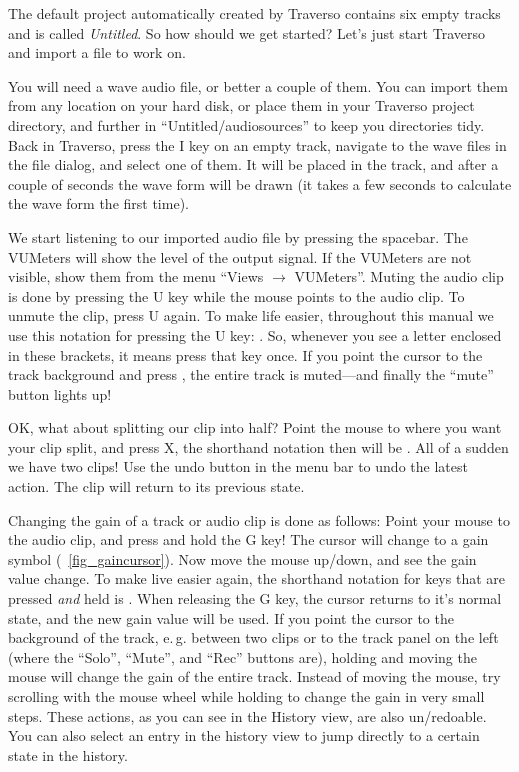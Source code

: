 The default project automatically created by Traverso contains six empty tracks and is called \emph{Untitled}. So how should we get started?
Let's just start Traverso and import a file to work on.

You will need a wave audio file, or better a couple of them. You can import them from any location on your hard disk, or place them in your Traverso project directory, and further in ``Untitled/audiosources'' to keep you directories tidy. Back in Traverso, press the I key on an empty track, navigate to the wave files in the file dialog, and select one of them. It will be placed in the track, and after a couple of seconds the wave form will be drawn (it takes a few seconds to calculate the wave form the first time).

We start listening to our imported audio file by pressing the spacebar. The VUMeters will show the level of the output signal. If the VUMeters are not visible, show them from the menu ``Views $\rightarrow$ VUMeters''. Muting the audio clip is done by pressing the U key while the mouse points to the audio clip. To unmute the clip, press U again. To make life easier, throughout this manual we use this notation for pressing the U key: . So, whenever you see a letter enclosed in these brackets, it means press that key once. If you point the cursor to the track background and press , the entire track is muted---and finally the ``mute'' button lights up!

OK, what about splitting our clip into half? Point the mouse to where you want your clip split, and press X, the shorthand notation then will be . All of a sudden we have two clips! Use the undo button in the menu bar to undo the latest action. The clip will return to its previous state.

Changing the gain of a track or audio clip is done as follows: Point your mouse to the audio clip, and press and hold the G key! The cursor will change to a gain symbol (\FigB\ \ref{fig_gaincursor}). Now move the mouse up/down, and see the gain value change. To make live easier again, the shorthand notation for keys that are pressed \emph{and} held is . When releasing the G key, the cursor returns to it's normal state, and the new gain value will be used. If you point the cursor to the background of the track, e.\,g. between two clips or to the track panel on the left (where the ``Solo'', ``Mute'', and ``Rec'' buttons are), holding  and moving the mouse will change the gain of the entire track. Instead of moving the mouse, try scrolling with the mouse wheel while holding  to change the gain in very small steps. These actions, as you can see in the History view, are also un/redoable. You can also select an entry in the history view to jump directly to a certain state in the history.


